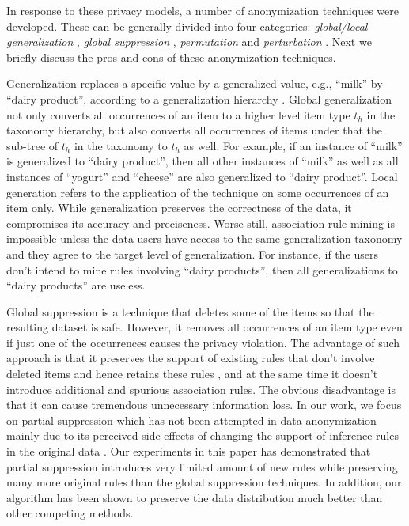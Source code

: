 In response to these privacy models, a number of anonymization techniques
were developed. These can be generally divided into four categories: {\em
global/local generalization} \cite{Terrovitis:2008:PAS, He:2009:ASD,
Cao:2010:rho}, {\em global suppression} \cite{Xu:2008:ATD, Cao:2010:rho},
{\em permutation} \cite{2011:TKDE:Anonymous} and {\em perturbation}
\cite{Zhang:2007:agg, ChenMFDX11:Diff}. Next we briefly discuss the pros and
cons of these anonymization techniques.

Generalization replaces a specific value by
a generalized value, e.g., ``milk'' by ``dairy product'',
according to a generalization hierarchy \cite{FungWCY10:Survey}.
Global generalization not only converts all occurrences of an item
to a higher level item type $t_h$ in the taxonomy hierarchy,
but also converts all occurrences of items under that the sub-tree of
$t_h$ in the taxonomy to $t_h$ as well. For example,
if an instance of ``milk'' is generalized to ``dairy product'',
then all other instances of ``milk'' as well as all instances of
``yogurt'' and ``cheese'' are also generalized to ``dairy product''.
Local generation refers to the application of the technique
on some occurrences of an item only.
While generalization preserves the correctness of the data,
it compromises its accuracy
and preciseness. Worse still, association rule mining is impossible
unless the data users have access to the same generalization taxonomy
and they agree to the target level of generalization. For instance, if
the users don't intend to mine rules involving ``dairy products'', then
all generalizations to ``dairy products'' are useless.

Global suppression is a technique that deletes some of the items so that the
resulting dataset is safe. However, it removes all occurrences of an item
type even if just one of the occurrences causes the privacy violation.
The advantage of such approach is that it preserves the support of
existing rules that don't involve deleted items and hence retains these rules
\cite{Xu:2008:ATD}, and at the same time it doesn't introduce
additional and spurious association rules.
The obvious disadvantage is that it can cause tremendous unnecessary
information loss. In our work, we focus on partial suppression
which has not been attempted in data anonymization
mainly due to its perceived side effects of changing the support of
inference rules in the original data \cite{Xu:2008:ATD, Cao:2010:rho,
tkde:VerykiosEBSD04:ARH, tkde:WuCC07:hiding}. Our experiments in
this paper has demonstrated that partial suppression introduces very limited
amount of new rules while preserving many more original rules than
the global suppression techniques. In addition, our algorithm has
been shown to preserve the data distribution much better than
other competing methods.

